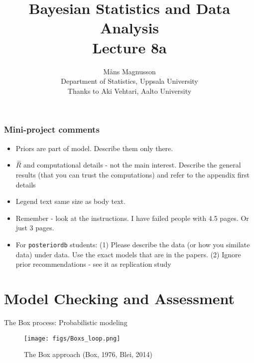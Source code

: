 \documentclass[10pt]{beamer}
\title[]{{\color{black}Bayesian Statistics and Data Analysis \\ Lecture 8a}}
\author[]{M{\aa}ns Magnusson \\ Department of Statistics, Uppsala University \\ Thanks to Aki Vehtari, Aalto University}
\date{}
\begin{document}
\frame{\titlepage
}

\begin{frame}
\frametitle{Mini-project comments}

  \begin{itemize}
  \item Priors are part of model. Describe them only there. \pause
  \item $\hat{R}$ and computational details - not the main interest. Describe the general results (that you can trust the computations) and refer to the appendix first details \pause
  \item Legend text same size as body text. \pause
  \item Remember - look at the instructions. I have failed people with 4.5 pages. Or just 3 pages.  \pause
  \item For \texttt{posteriordb} students: (1) Please describe the data (or how you similate data) under data.
Use the exact models that are in the papers. (2) Ignore prior recommendations - see it as replication study
  \end{itemize}

\end{frame}

\section{Model Checking and Assessment}
\frame{\sectionpage}



\begin{frame}{The Box process: Probabilistic modeling}

\begin{figure}
    \centering
    \texttt{[image: figs/Boxs\_loop.png]}
    \caption{The Box approach (Box, 1976, Blei, 2014)}
\end{figure}
\end{frame}
\end{document}
